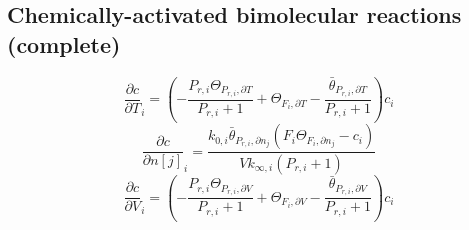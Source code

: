 \documentclass[a4paper,10pt]{article}
\begin{document}
\subsection{Chemically-activated bimolecular reactions (complete)}
\begin{dmath} \frac{\partial c }{\partial T }_{i} = \left(- \frac{P_{r, i} \Theta_{P_{r,i}, \partial T}}{P_{r, i} + 1} + \Theta_{F_i, \partial T} - \frac{\bar{\theta}_{P_{r, i}, \partial T}}{P_{r, i} + 1}\right) c_{i}\end{dmath} 
\begin{dmath} \frac{\partial c }{\partial n[j] }_{i} = \frac{k_{0, i} \bar{\theta}_{P_{r, i}, \partial n_j} \left(F_{i} \Theta_{F_i, \partial n_j} - c_{i}\right)}{V k_{\infty, i} \left(P_{r, i} + 1\right)}\end{dmath} 
\begin{dmath} \frac{\partial c }{\partial V }_{i} = \left(- \frac{P_{r, i} \Theta_{P_{r,i}, \partial V}}{P_{r, i} + 1} + \Theta_{F_i, \partial V} - \frac{\bar{\theta}_{P_{r, i}, \partial V}}{P_{r, i} + 1}\right) c_{i}\end{dmath} 
\end{document}
